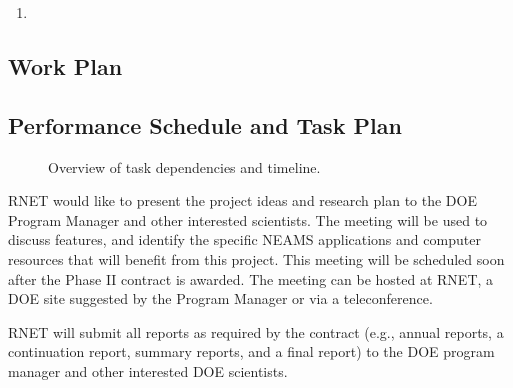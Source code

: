 \begin{enumerate}
\item {} 

\end{enumerate}

\subsection{Work Plan}
\label{sec:workplan}


\subsection{Performance Schedule and Task Plan}
\label{sec:taskplan}

\begin{wrapfigure}{r}{0.5\linewidth}%
\begin{center}
\leavevmode
\end{center}
\caption{Overview of task dependencies and timeline.}
\label{fig:tasks}
\end{wrapfigure}

RNET would like to present the project ideas and research plan to the
DOE Program Manager and other interested scientists. The meeting will
be used to discuss features, and identify the specific NEAMS applications and computer
resources that will benefit from this project.  This meeting will be
scheduled soon after the Phase II contract is awarded. The meeting can
be hosted at RNET, a DOE site suggested by the Program Manager or via
a teleconference.

RNET will submit all reports as required by the contract (e.g., annual reports, 
a continuation report, summary reports, and a final report) to the DOE program 
manager and other interested DOE scientists.

